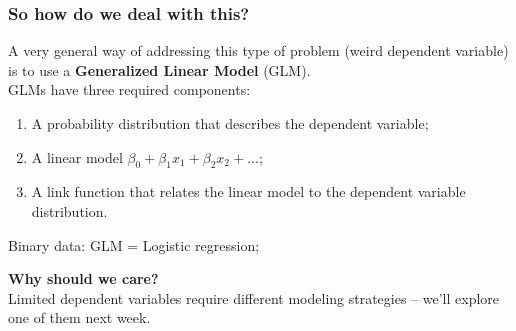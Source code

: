 \documentclass[aspectratio=169]{beamer}
\begin{document}
\begin{frame}
\frametitle{So how do we deal with this?}
A very general way of addressing this type of problem (weird dependent variable) is to use a \textbf{Generalized Linear Model} (GLM).\\
\bigskip
\bigskip
{} GLMs have three required components:
\begin{enumerate}
\item A probability distribution that describes the dependent variable;
\item A linear model $\beta_0 + \beta_1x_1 + \beta_2x_2 + ...$;
\item A link function that relates the linear model to the dependent variable distribution.
\end{enumerate}
\bigskip

Binary data: GLM = Logistic regression;
\end{frame}

\begin{frame}

\begin{center}
\Huge\textbf{Why should we care?}\\
\bigskip
\bigskip
\large Limited dependent variables require different modeling strategies -- we'll explore one of them next week.\\
\end{center}

\end{frame}
\end{document}

